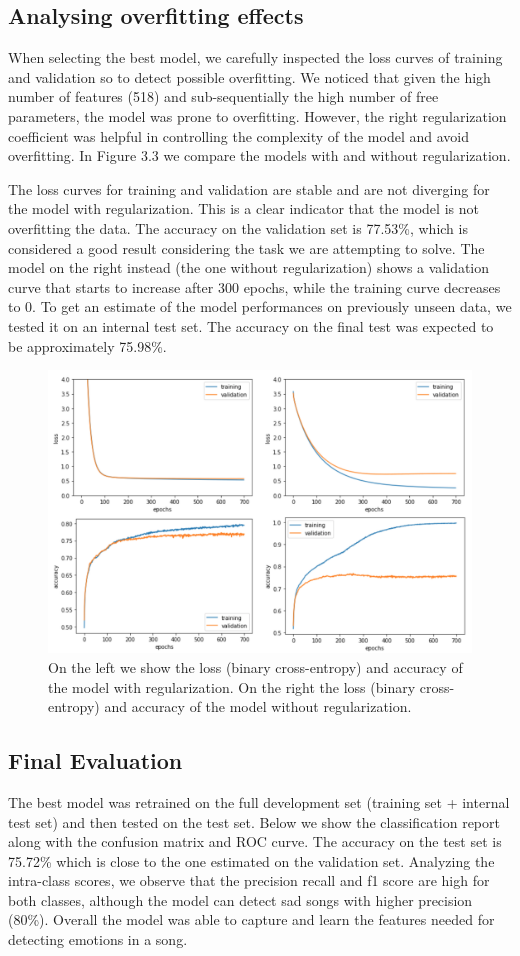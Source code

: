 \subsection{Analysing overfitting effects}
When selecting the best model, we carefully inspected the loss curves of training and validation so to detect possible overfitting. We noticed that given the high number of features (518) and sub-sequentially the high number of free parameters, the model was prone to overfitting. However, the right regularization coefficient was helpful in controlling the complexity of the model and avoid overfitting. 
In Figure 3.3 we compare the models with and without regularization.

The loss curves for training and validation are stable and are not diverging for the model with regularization. This is a clear indicator that the model is not overfitting the data. The accuracy on the validation set is 77.53\%, which is considered a good result considering the task we are attempting to solve. The model on the right instead (the one without regularization) shows a validation curve that starts to increase after 300 epochs, while the training curve decreases to 0. To get an estimate of the model performances on previously unseen data, we tested it on an internal test set. The accuracy on the final test was expected to be approximately 75.98\%. 

\begin{figure}[h]
  \centering
  \includegraphics[width=0.6\linewidth]{images/MLP loss-acc comparison .png}
  \caption{On the left we show the loss (binary cross-entropy) and accuracy of the model with regularization. On the right the loss (binary cross-entropy) and accuracy of the model without regularization.}
\end{figure}

\subsection{Final Evaluation}
The best model was retrained on the full development set (training set + internal test set) and then tested on the test set. Below we show the classification report along with the confusion matrix and ROC curve.
The accuracy on the test set is 75.72\% which is close to the one estimated on the validation set. Analyzing the intra-class scores, we observe that the precision recall and f1 score are high for both classes, although the model can detect sad songs with higher precision (80\%). Overall the model was able to capture and learn the features needed for detecting emotions in a song. 

